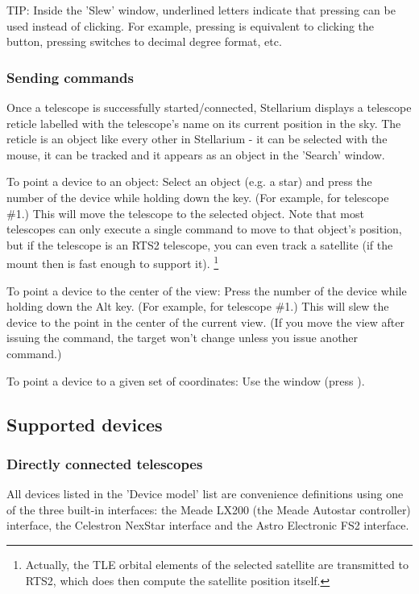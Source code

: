 TIP: Inside the 'Slew' window, underlined letters indicate that
pressing  can be used instead of
clicking. For example, pressing  is equivalent to
clicking the  button, pressing  switches to
decimal degree format, etc.


\subsubsection{Sending commands}

Once a telescope is successfully started/connected, Stellarium
displays a telescope reticle labelled with the telescope's name on its
current position in the sky. The reticle is an object like every other
in Stellarium - it can be selected with the mouse, it can be tracked
and it appears as an object in the 'Search' window.

To point a device to an object: Select an object (e.g. a star) and
press the number of the device while holding down the \keys{\ctrl} key. (For
example,  for telescope \#1.) This will move the telescope to the
selected object. Note that most telescopes can only execute a single command to 
move to that object's position, but if the telescope is an RTS2 telescope, 
you can even track a satellite (if the mount then is fast enough to support it).%
\footnote{Actually, the TLE orbital elements of the selected satellite are transmitted 
to RTS2, which does then compute the satellite position itself.}

To point a device to the center of the view: Press the number of the
device while holding down the Alt key. (For example,  for
telescope \#1.) This will slew the device to the point in the center of
the current view. (If you move the view after issuing the command, the
target won't change unless you issue another command.)

To point a device to a given set of coordinates: Use the  window (press ).

\subsection{Supported devices}
\label{sec:plugins:TelescopeControl:supported}

\subsubsection{Directly connected telescopes}
All devices listed in the 'Device model' list are convenience
definitions using one of the three built-in interfaces: the Meade LX200
(the Meade Autostar controller) interface, the Celestron NexStar
interface and the Astro Electronic FS2 interface.

